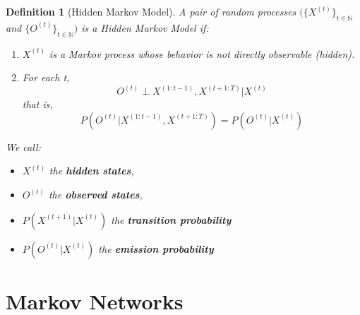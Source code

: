 \documentclass[11pt]{article}
\numberwithin{equation}{section}
\theoremstyle{boldStyle}
\theoremstyle{boldBlueStyle}
\theoremstyle{boldPurpleStyle}
\theoremstyle{boldRedStyle}
\newtheorem{definition}{Definition}[section]
\begin{document}
\begin{definition}[Hidden Markov Model]
    A pair of random processes $( \{ X^{(t)} \}_{t\in \mathbb{N}}$ and $\{ O^{(t)} \}_{t\in \mathbb{N}} )$ is a Hidden Markov Model if:
    \begin{enumerate}
        \item $X^{(t)}$ is a Markov process whose behavior is not directly observable (hidden).
        \item For each t,
            \[
                O^{(t)} \perp X^{(1:t-1)}, X^{(t+1:T)} | X^{(t)}  
            \]
            that is,
            \[
                P(O^{(t)} | X^{(1:t-1)}, X^{(t+1:T)}) = P(O^{(t)} | X^{(t)})
            \]
    \end{enumerate}
    We call:  
    \begin{itemize}
        \item $X^{(t)}$ the \textbf{hidden states}, 
        \item $O^{(t)}$ the \textbf{observed states},
        \item $P(X^{(t+1)} | X^{(t)})$ the \textbf{transition probability}
        \item $P(O^{(t)} | X^{(t)})$ the \textbf{emission probability}
    \end{itemize}
\end{definition}




\newpage
\section{Markov Networks}
\end{document}
